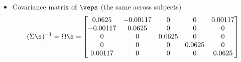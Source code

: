 \begin{itemize}
\item Covariance matrix of $\veps$ (the same across subjects)
\begin{eqnarray*}
(\Sigma\s)^{-1} = \Omega\s = 
\begin{bmatrix}
0.0625 & -0.00117 & 0 & 0 & 0.00117 \\
-0.00117 & 0.0625 & 0 & 0 & 0 \\
0 & 0 & 0.0625 & 0 & 0 \\
0 & 0 & 0 & 0.0625 & 0 \\
0.00117 & 0 & 0 & 0 & 0.0625 
\end{bmatrix}
\end{eqnarray*}

\end{itemize}

